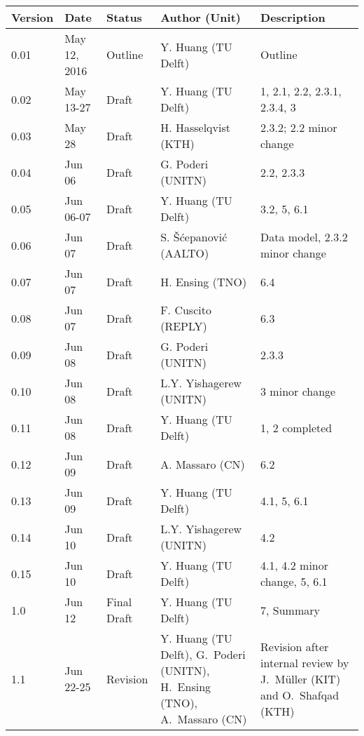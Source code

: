 {\small
\begin{tabularx}{\textwidth}{|l|l|l|>{\raggedright\arraybackslash}p{4cm}|X|}
\hline
\textbf{Version}	& \textbf{Date} &	\textbf{Status} &	\textbf{Author (Unit)} &	\textbf{Description}  \\ \hline
0.01 & May 12, 2016 & Outline & Y. Huang (TU Delft) & Outline\\ \hline
0.02 & May 13-27 & Draft & Y. Huang (TU Delft) & 1, 2.1, 2.2, 2.3.1, 2.3.4, 3\\ \hline
0.03 & May 28 & Draft & H. Hasselqvist (KTH) &  2.3.2; 2.2 minor change\\ \hline
0.04 & Jun 06 & Draft &  G. Poderi (UNITN) & 2.2, 2.3.3 \\ \hline
0.05 & Jun 06-07 & Draft & Y. Huang (TU Delft) & 3.2, 5, 6.1 \\ \hline
0.06 & Jun 07 & Draft &  S. \v{S}\'{c}epanovi\'{c} (AALTO) & Data model, 2.3.2 minor change \\ \hline
0.07 & Jun 07 & Draft &  H. Ensing (TNO) & 6.4 \\ \hline
0.08 & Jun 07 & Draft &  F. Cuscito (REPLY) & 6.3 \\ \hline
0.09 & Jun 08 & Draft &  G. Poderi (UNITN) & 2.3.3 \\ \hline
0.10 & Jun 08 & Draft &  L.Y. Yishagerew (UNITN) & 3 minor change \\ \hline
0.11 & Jun 08 & Draft & Y. Huang (TU Delft) & 1, 2 completed \\ \hline
0.12 & Jun 09 & Draft & A. Massaro  (CN) & 6.2 \\ \hline
0.13 & Jun 09 & Draft & Y. Huang (TU Delft) & 4.1, 5, 6.1 \\ \hline
0.14 & Jun 10 & Draft & L.Y. Yishagerew (UNITN) & 4.2 \\ \hline
0.15 & Jun 10 & Draft & Y. Huang (TU Delft) & 4.1, 4.2 minor change, 5, 6.1 \\ \hline
1.0 & Jun 12 & Final Draft & Y. Huang (TU Delft) & 7, Summary \\ \hline
1.1 & Jun 22-25 & Revision & Y. Huang (TU Delft), G.~Poderi (UNITN),  H.~Ensing (TNO), A.~Massaro  (CN)  & Revision after internal review by  J.~M\"uller (KIT) and O.~Shafqad (KTH) \\ \hline
\end{tabularx}
}


